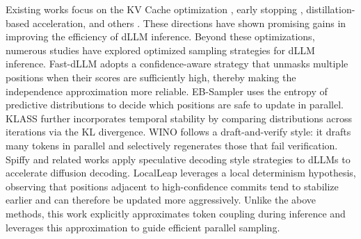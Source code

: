 Existing works focus on the KV Cache optimization \cite{fastdllm, dkvcache}, early stopping \cite{dllm-var, daedal}, distillation-based \cite{dparallel} acceleration, and others \cite{quantdllm, sparsedllm, dsb}. 
These directions have shown promising gains in improving the efficiency of dLLM inference. Beyond these optimizations, numerous studies have explored optimized sampling strategies for dLLM inference. Fast-dLLM \cite{fastdllm} adopts a confidence-aware strategy that unmasks multiple positions when their scores are sufficiently high, thereby making the independence approximation more reliable. EB-Sampler \cite{ebsampler} uses the entropy of predictive distributions to decide which positions are safe to update in parallel. KLASS \cite{klass} further incorporates temporal stability by comparing distributions across iterations via the KL divergence. 
WINO \cite{wino} follows a draft-and-verify style: it drafts many tokens in parallel and selectively regenerates those that fail verification. 
Spiffy and related works \cite{spiffy, orchestrating} apply speculative decoding style strategies to dLLMs to accelerate diffusion decoding. LocalLeap \cite{localleap} leverages a local determinism hypothesis, observing that positions adjacent to high-confidence commits tend to stabilize earlier and can therefore be updated more aggressively. 
Unlike the above methods, this work explicitly approximates token coupling during inference and leverages this approximation to guide efficient parallel sampling.